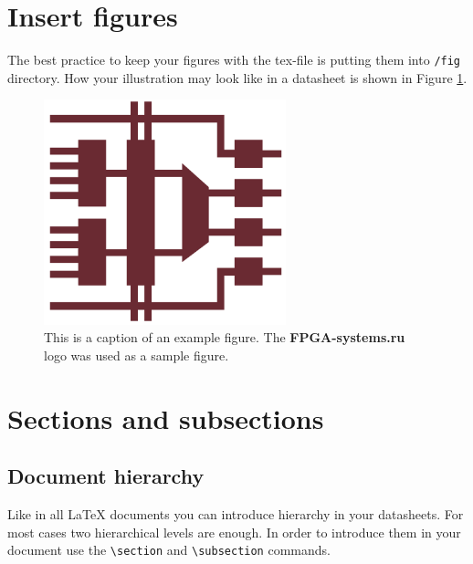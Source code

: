 \documentclass[a4paper, 10pt, onecolumn]{article}
\begin{document}
\section*{Insert figures}
The best practice to keep your figures with the tex-file is putting them into \verb+/fig+ directory. 
How your illustration may look like in a datasheet is shown in Figure \ref{fig:FigureRef}.
\begin{figure}[H]
    \begin{center}
        \includegraphics[width=7cm]{fig/SampleFigure.png}
    \end{center}
    \caption{This is a caption of an example figure. The \textbf{FPGA-systems.ru} logo was used as a sample figure.}
    \label{fig:FigureRef}
\end{figure}

\section*{Sections and subsections}

\subsection*{Document hierarchy}
Like in all LaTeX documents you can introduce hierarchy in your datasheets. 
For most cases two hierarchical levels are enough. 
In order to introduce them in your document use the \verb+\section+ and \verb+\subsection+ commands. 
\end{document}
